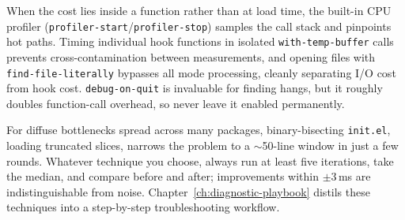 When the cost lies inside a function rather than at load time, the
built-in CPU profiler (\texttt{profiler-start}/\texttt{profiler-stop})
samples the call stack and pinpoints hot paths.  Timing individual hook
functions in isolated \texttt{with-temp-buffer} calls prevents
cross-contamination between measurements, and opening files with
\texttt{find-file-literally} bypasses all mode processing, cleanly
separating I/O cost from hook cost.  \texttt{debug-on-quit} is
invaluable for finding hangs, but it roughly doubles function-call
overhead, so never leave it enabled permanently.

For diffuse bottlenecks spread across many packages, binary-bisecting
\texttt{init.el}, loading truncated slices, narrows the problem to a
\(\sim\)50-line window in just a few rounds.  Whatever technique you
choose, always run at least five iterations, take the median, and
compare before and after; improvements within \(\pm\)3\,ms are
indistinguishable from noise.
Chapter~\ref{ch:diagnostic-playbook} distils these techniques into a
step-by-step troubleshooting workflow.
